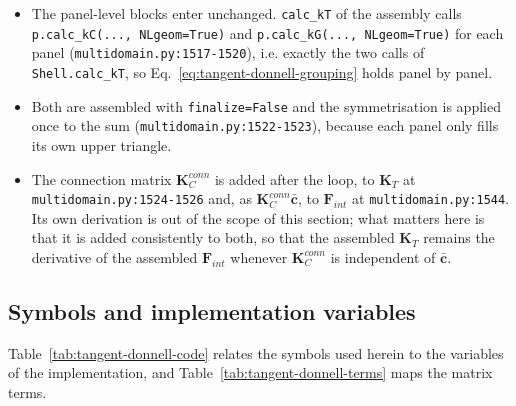 \begin{itemize}
	\item The panel-level blocks enter unchanged. \texttt{calc\_kT} of the assembly calls \texttt{p.calc\_kC(..., NLgeom=True)} and \texttt{p.calc\_kG(..., NLgeom=True)} for each panel (\texttt{multidomain.py:1517-1520}), i.e. exactly the two calls of \texttt{Shell.calc\_kT}, so Eq.~\ref{eq:tangent-donnell-grouping} holds panel by panel.
	\item Both are assembled with \texttt{finalize=False} and the symmetrisation is applied once to the sum (\texttt{multidomain.py:1522-1523}), because each panel only fills its own upper triangle.
	\item The connection matrix $\boldsymbol{K}_{C}^{conn}$ is added after the loop, to $\boldsymbol{K}_T$ at \texttt{multidomain.py:1524-1526} and, as $\boldsymbol{K}_{C}^{conn}\bar{\boldsymbol{c}}$, to $\boldsymbol{F}_{int}$ at \texttt{multidomain.py:1544}. Its own derivation is out of the scope of this section; what matters here is that it is added consistently to both, so that the assembled $\boldsymbol{K}_T$ remains the derivative of the assembled $\boldsymbol{F}_{int}$ whenever $\boldsymbol{K}_{C}^{conn}$ is independent of $\bar{\boldsymbol{c}}$.
\end{itemize}

\subsection{Symbols and implementation variables}\label{sec:tangent-donnell-mapping}

Table~\ref{tab:tangent-donnell-code} relates the symbols used herein to the variables of the implementation, and Table~\ref{tab:tangent-donnell-terms} maps the matrix terms.

